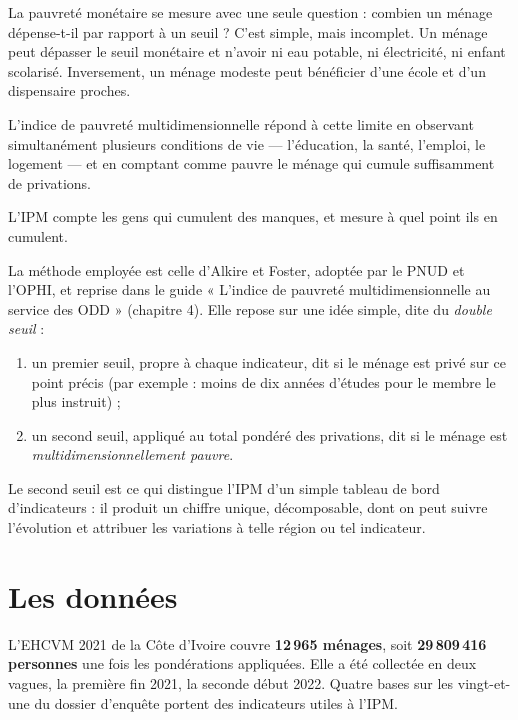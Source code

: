 \documentclass[11pt,a4paper]{article}
\begin{document}
La pauvreté monétaire se mesure avec une seule question : combien un ménage dépense-t-il par
rapport à un seuil ? C'est simple, mais incomplet. Un ménage peut dépasser le seuil monétaire et
n'avoir ni eau potable, ni électricité, ni enfant scolarisé. Inversement, un ménage modeste peut
bénéficier d'une école et d'un dispensaire proches.

L'indice de pauvreté multidimensionnelle répond à cette limite en observant simultanément
plusieurs conditions de vie --- l'éducation, la santé, l'emploi, le logement --- et en comptant
comme pauvre le ménage qui cumule suffisamment de privations.

\begin{retenir}
L'IPM compte les gens qui cumulent des manques, et mesure à quel point ils en cumulent.
\end{retenir}

La méthode employée est celle d'Alkire et Foster, adoptée par le PNUD et l'OPHI, et reprise dans
le guide « L'indice de pauvreté multidimensionnelle au service des ODD » (chapitre 4). Elle repose
sur une idée simple, dite du \emph{double seuil} :

\begin{enumerate}
  \item un premier seuil, propre à chaque indicateur, dit si le ménage est privé sur ce point
        précis (par exemple : moins de dix années d'études pour le membre le plus instruit) ;
  \item un second seuil, appliqué au total pondéré des privations, dit si le ménage est
        \emph{multidimensionnellement pauvre}.
\end{enumerate}

Le second seuil est ce qui distingue l'IPM d'un simple tableau de bord d'indicateurs : il produit
un chiffre unique, décomposable, dont on peut suivre l'évolution et attribuer les variations à
telle région ou tel indicateur.

\section{Les données}

L'EHCVM 2021 de la Côte d'Ivoire couvre \textbf{12\,965 ménages}, soit
\textbf{29\,809\,416 personnes} une fois les pondérations appliquées. Elle a été collectée en deux
vagues, la première fin 2021, la seconde début 2022. Quatre bases sur les vingt-et-une du dossier
d'enquête portent des indicateurs utiles à l'IPM.
\end{document}
